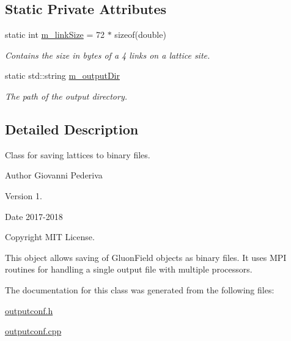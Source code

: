 \subsection*{Static Private Attributes}
\begin{DoxyCompactItemize}
\item 
static int \hyperlink{classLatticeIO_1_1OutputConf_a6866129cf7fe3c5e36034296b2e1bf15}{m\+\_\+link\+Size} = 72 $\ast$ sizeof(double)\hypertarget{classLatticeIO_1_1OutputConf_a6866129cf7fe3c5e36034296b2e1bf15}{}\label{classLatticeIO_1_1OutputConf_a6866129cf7fe3c5e36034296b2e1bf15}

\begin{DoxyCompactList}\small\item\em Contains the size in bytes of a 4 links on a lattice site. \end{DoxyCompactList}\item 
static std\+::string \hyperlink{classLatticeIO_1_1OutputConf_a99c20c25ac656605f5d42f5d3bd8b9d4}{m\+\_\+output\+Dir}\hypertarget{classLatticeIO_1_1OutputConf_a99c20c25ac656605f5d42f5d3bd8b9d4}{}\label{classLatticeIO_1_1OutputConf_a99c20c25ac656605f5d42f5d3bd8b9d4}

\begin{DoxyCompactList}\small\item\em The path of the output directory. \end{DoxyCompactList}\end{DoxyCompactItemize}


\subsection{Detailed Description}
Class for saving lattices to binary files. 

\begin{DoxyAuthor}{Author}
Giovanni Pederiva 
\end{DoxyAuthor}
\begin{DoxyVersion}{Version}
1. 
\end{DoxyVersion}
\begin{DoxyDate}{Date}
2017-\/2018 
\end{DoxyDate}
\begin{DoxyCopyright}{Copyright}
M\+IT License.
\end{DoxyCopyright}
This object allows saving of Gluon\+Field objects as binary files. It uses M\+PI routines for handling a single output file with multiple processors. 

The documentation for this class was generated from the following files\+:\begin{DoxyCompactItemize}
\item 
\hyperlink{outputconf_8h}{outputconf.\+h}\item 
\hyperlink{outputconf_8cpp}{outputconf.\+cpp}\end{DoxyCompactItemize}
